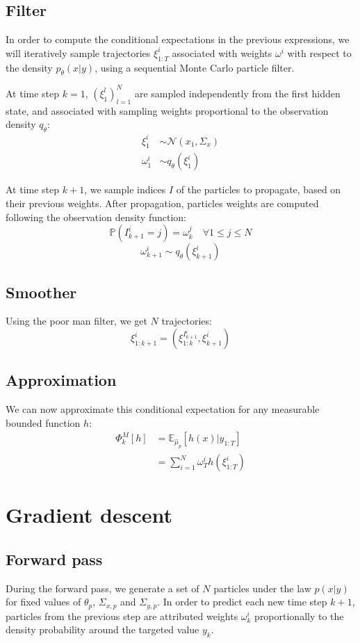 \documentclass[10pt,a4paper]{report}
\begin{document}
\subsection{Filter}
In order to compute the conditional expectations in the previous expressions, we will iteratively sample trajectories $\xi_{1:T}^i$ associated with weights $\omega^i$ with respect to the density $p_\theta(x | y)$, using a sequential Monte Carlo particle filter.

At time step $k=1$, $(\xi_1^l)_{l=1}^N$ are sampled independently from the first hidden state, and associated with sampling weights proportional to the observation density $q_\theta$:
\begin{align*}
        \xi_1^i    & \sim \mathcal{N}(x_1, \Sigma_x) \\
        \omega_1^i & \sim q_\theta(\xi_1^i)
\end{align*}

At time step $k+1$, we sample indices $I$ of the particles to propagate, based on their previous weights.
After propagation, particles weights are computed following the observation density function:
$$\mathbb{P}(I_{k+1}^i=j) = \omega_k^j \quad \forall 1 \leq j \leq N$$
$$\omega_{k+1}^i \sim q_\theta(\xi_{k+1}^i)$$

\subsection{Smoother}
Using the poor man filter, we get $N$ trajectories:
$$\xi_{1:k+1}^{i} = (\xi_{1:k}^{I_{k+1}^i}, \xi_{k+1}^i)$$

\subsection{Approximation}
We can now approximate this conditional expectation for any measurable bounded function $h$:
\begin{align*}
        \Phi_k^M[h] & = \mathbb{E}_{\hat \mu_p} \left[ h(x) | y_{1:T} \right] \\
                    & = \sum_{i=1}^N \omega_T^i h(\xi_{1:T}^i)
\end{align*}

\section{Gradient descent}
\label{sec:gradient_descent}

\subsection{Forward pass}
During the forward pass, we generate a set of $N$ particles under the law $p(x|y)$ for fixed values of $\theta_p$, $\Sigma_{x, p}$ and $\Sigma_{y, p}$.
In order to predict each new time step $k+1$, particles from the previous step are attributed weights $\omega_k^i$ proportionally to the density probability around the targeted value $y_k$.
\end{document}
